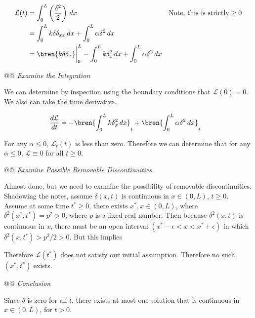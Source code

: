 \documentclass[10pt]{article}
\begin{document}
\begin{easylist}[enumerate]
    \begin{align*}
        \mathcal{L}(t) &= \int_0^L \pren{\frac{\delta^2}{2}} \, dx & \text{Note, this is strictly} \ge 0\\
        &= \int_0^L k \delta \delta_{xx} \, dx + \int_0^L \alpha \delta^2 \, dx\\
        &= \bren{k \delta \delta_x}\bigg|_0^L - \int_0^L k \delta_x^2 \, dx + \int_0^L \alpha \delta^2 \, dx\\
    \end{align*}

    @@ \textit{Examine the Integration}

    We can determine by inspection using the boundary conditions that $\mathcal{L}(0) = 0$. We also can take the time
    derivative.

    \begin{align*}
        \frac{d\mathcal{L}}{dt} &= - \bren{\int_0^L k \delta_x^2 \, dx}_t + \bren{\int_0^L \alpha \delta^2 \, dx}_t
    \end{align*}

    For any $\alpha \le 0$, $\mathcal{L}_t(t)$ is less than zero. Therefore we can determine that for any $\alpha \le
    0$, $\mathcal{L} \equiv 0$ for all $t \ge 0$.

    @@ \textit{Examine Possible Removable Discontinuities}

    Almost done, but we need to examine the possibility of removable discontinuities. Shadowing the notes, assume
    $\delta(x, t)$ is continuous in $x \in (0, L)$, $t \ge 0$. Assume at some time $t^* \ge 0$, there exists $x^*, x \in
    (0, L)$, where $\delta^2(x^*, t^*) = p^2 > 0$, where $p$ is a fixed real number. Then because $\delta^2(x, t)$ is
    continuous in $x$, there must be an open interval $(x^* - \epsilon < x < x^* + \epsilon)$ in which $\delta^2(x, t^*)
    > p^2 / 2 > 0$. But this implies


    Therefore $\mathcal{L}(t^*)$ does not satisfy our initial assumption. Therefore no such $(x^*, t^*)$ exists.

    @@ \textit{Conclusion}

    Since $\delta$ is zero for all $t$, there exists at most one solution that is continuous in $x \in (0, L)$, for $t >
    0$.


\end{easylist}
\end{document}
